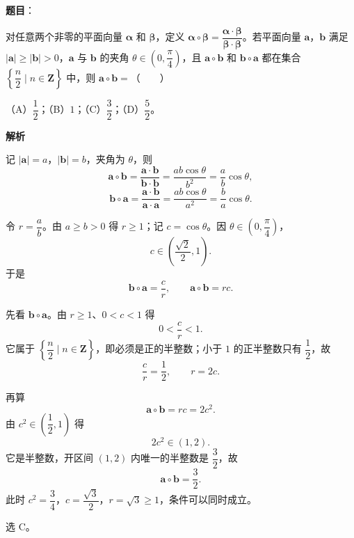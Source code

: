 \begin{answer}

\textbf{题目}：

对任意两个非零的平面向量 $\boldsymbol\alpha$ 和 $\boldsymbol\beta$，定义 $\boldsymbol\alpha\circ\boldsymbol\beta=\dfrac{\boldsymbol\alpha\cdot\boldsymbol\beta}{\boldsymbol\beta\cdot\boldsymbol\beta}$。若平面向量 $\boldsymbol a$，$\boldsymbol b$ 满足 $|\boldsymbol a|\geqslant|\boldsymbol b|>0$，$\boldsymbol a$ 与 $\boldsymbol b$ 的夹角 $\theta\in\left(0,\dfrac\pi4\right)$，且 $\boldsymbol a\circ\boldsymbol b$ 和 $\boldsymbol b\circ\boldsymbol a$ 都在集合 $\left\{\dfrac n2\mid n\in\mathbf Z\right\}$ 中，则 $\boldsymbol a\circ\boldsymbol b=$\mbox{（　　）}

（A）$\dfrac12$；（B）$1$；（C）$\dfrac32$；（D）$\dfrac52$。

\textbf{解析}

记 $|\boldsymbol a|=a$，$|\boldsymbol b|=b$，夹角为 $\theta$，则
\nopagebreak[4]
\[\boldsymbol a\circ\boldsymbol b=\frac{\boldsymbol a\cdot\boldsymbol b}{\boldsymbol b\cdot\boldsymbol b}
=\frac{ab\cos\theta}{b^2}=\frac ab\cos\theta,\]
\nopagebreak[4]
\[\boldsymbol b\circ\boldsymbol a=\frac{\boldsymbol a\cdot\boldsymbol b}{\boldsymbol a\cdot\boldsymbol a}
=\frac{ab\cos\theta}{a^2}=\frac ba\cos\theta.\]

令 $r=\dfrac ab$。由 $a\geqslant b>0$ 得 $r\geqslant1$；记 $c=\cos\theta$。因 $\theta\in\left(0,\dfrac\pi4\right)$，
\nopagebreak[4]
\[c\in\left(\frac{\sqrt2}2,1\right).\]
于是
\nopagebreak[4]
\[\boldsymbol b\circ\boldsymbol a=\frac cr,\qquad
\boldsymbol a\circ\boldsymbol b=rc.\]

先看 $\boldsymbol b\circ\boldsymbol a$。由 $r\geqslant1$、$0<c<1$ 得
\nopagebreak[4]
\[0<\frac cr<1.\]
它属于 $\left\{\dfrac n2\mid n\in\mathbf Z\right\}$，即必须是正的半整数；小于 $1$ 的正半整数只有 $\dfrac12$，故
\nopagebreak[4]
\[\frac cr=\frac12,\qquad r=2c.\]

再算
\nopagebreak[4]
\[\boldsymbol a\circ\boldsymbol b=rc=2c^2.\]
由 $c^2\in\left(\dfrac12,1\right)$ 得
\nopagebreak[4]
\[2c^2\in(1,2).\]
它是半整数，开区间 $(1,2)$ 内唯一的半整数是 $\dfrac32$，故
\nopagebreak[4]
\[\boldsymbol a\circ\boldsymbol b=\frac32.\]
此时 $c^2=\dfrac34$，$c=\dfrac{\sqrt3}2$，$r=\sqrt3\geqslant1$，条件可以同时成立。

选 C。


\end{answer}

